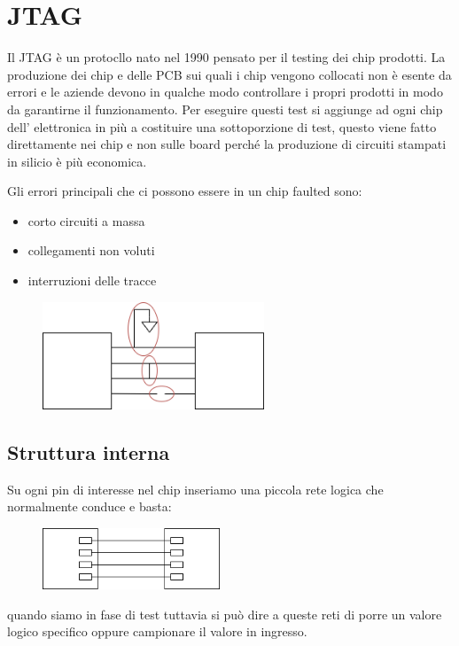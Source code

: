 \section{JTAG}
Il JTAG è un protocllo nato nel 1990 pensato per il testing dei chip prodotti.
La produzione dei chip e delle PCB sui quali i chip vengono collocati non è esente da errori e le aziende devono in qualche modo controllare i propri prodotti in modo da garantirne il funzionamento.
Per eseguire questi test si aggiunge ad ogni chip dell' elettronica in più a costituire una sottoporzione di test, questo viene fatto direttamente nei chip e non sulle board perché la produzione di circuiti stampati in silicio è più economica.

Gli errori principali che ci possono essere in un chip faulted sono:
\begin{itemize}
    \item corto circuiti a massa
    \item collegamenti non voluti
    \item interruzioni delle tracce
\end{itemize}
\begin{figure}[H]
    \centering
    \includegraphics[width=250px]{images/26_JTAG/production_errors.png}
\end{figure}

\subsection{Struttura interna}
Su ogni pin di interesse nel chip inseriamo una piccola rete logica che normalmente conduce e basta:
\begin{figure}[H]
    \centering
    \includegraphics[width=200px]{images/26_JTAG/JTAG_internal.png}
\end{figure}
quando siamo in fase di test tuttavia si può dire a queste reti di porre un valore logico specifico oppure campionare il valore in ingresso.

